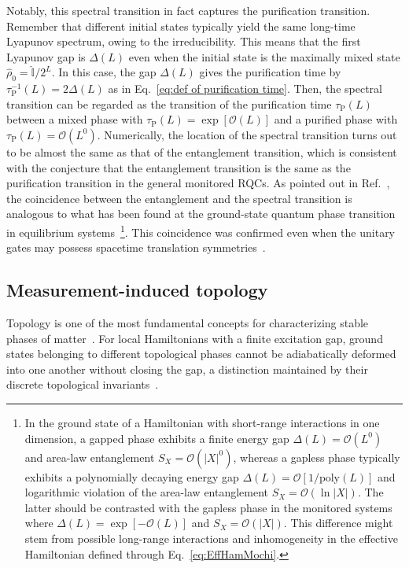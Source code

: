 \documentclass[preprint,pteplogo]{ptephy_v2}%
\numberwithin{equation}{section}
\theoremstyle{definition}
\newcommand{\mc}[1]{\mathcal{#1}}
\begin{document}
Notably, this spectral transition in fact captures the purification transition.
Remember that different initial states typically yield the same long-time Lyapunov spectrum, owing to the irreducibility. 
This means that the first Lyapunov gap is $\Delta(L)$ even when the initial state is the maximally mixed state
$\hat{\rho}_0 = \hat{\mathbb{I}}/2^L$.
In this case, the gap $\Delta(L)$ gives the purification time by $\tau_\mathrm{P}^{-1}(L)=2\Delta(L)$ as in Eq.~\eqref{eq:def of purification time}.
Then, the spectral transition can be regarded as the transition of the purification time $\tau_\mathrm{P}(L)$ between a mixed phase with $\tau_\mathrm{P}(L)= \exp[\mathcal{O}(L)]$ and a purified phase with $\tau_\mathrm{P}(L)=\mathcal{O}(L^0)$.
Numerically, the location of the spectral transition turns out to be almost the same as that of the entanglement transition, which is consistent with the conjecture that the entanglement transition is the same as the purification transition in the general monitored RQCs.
As pointed out in Ref.~\cite{mochizuki2025measurement}, the coincidence between the entanglement and the spectral transition is analogous to what has been found at the ground-state quantum phase transition in equilibrium systems~\cite{Eisert2010colloquium, laflorencie2016quantum}\footnote{
In the ground state of a Hamiltonian with short-range interactions in one dimension, a gapped phase exhibits a finite energy gap $\Delta(L) = \mc{O}(L^0)$ and area-law entanglement $S_X = \mc{O}(|X|^0)$, whereas a gapless phase typically exhibits a polynomially decaying energy gap $\Delta(L) = \mc{O}[1/\mathrm{poly}(L)]$ and logarithmic violation of the area-law entanglement $S_X = \mc{O}(\ln |X|)$.
The latter should be contrasted with the gapless phase in the monitored systems where $\Delta(L) = \exp[-\mc{O}(L)]$ and $S_X = \mc{O}(|X|)$.
This difference might stem from possible long-range interactions and inhomogeneity in the effective Hamiltonian defined through Eq.~\eqref{eq:EffHamMochi}.
}.
This coincidence was confirmed even when the unitary gates may possess spacetime translation symmetries~\cite{mochizuki2025transitions}.

\subsection{Measurement-induced topology}
\label{sec:topology_MIPT}

Topology is one of the most fundamental concepts for characterizing stable phases of matter~\cite{wen2017colloquium}.
For local Hamiltonians with a finite excitation gap, ground states belonging to different topological phases cannot be adiabatically deformed into one another without closing the gap, a distinction maintained by their discrete topological invariants~\cite{chen2010local}.
\end{document}
